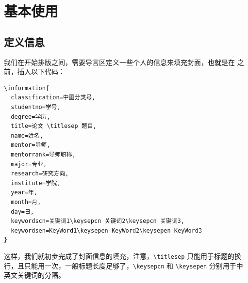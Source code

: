 \chapter{基本使用}

\section{定义信息}
我们在开始排版之间，需要导言区定义一些个人的信息来填充封面，也就是在 \verb|| 之前，插入以下代码：
\begin{lstlisting}[caption=个人信息定义]
\information{
  classification=中图分类号,     
  studentno=学号,       
  degree=学历,          
  title=论文 \titlesep 题目,         
  name=姓名,           
  mentor=导师,     
  mentorrank=导师职称,     
  major=专业,           
  research=研究方向,     
  institute=学院,       
  year=年,           
  month=月,        
  day=日,           
  keywordscn=关键词1\keysepcn 关键词2\keysepcn 关键词3,     
  keywordsen=KeyWord1\keysepen KeyWord2\keysepen KeyWord3
}
\end{lstlisting}
这样，我们就初步完成了封面信息的填充，注意，\verb|\titlesep| 只能用于标题的换行，且只能用一次，一般标题长度足够了，\verb|\keysepcn| 和 \verb|\keysepen| 分别用于中英文关键词的分隔。


